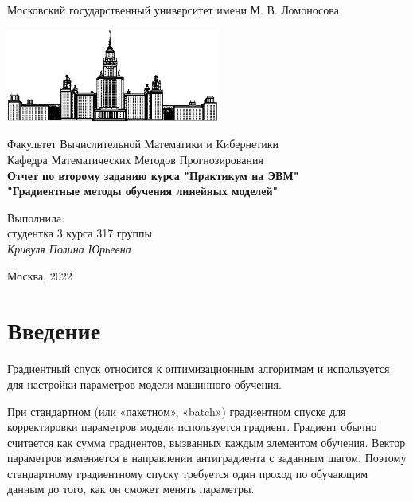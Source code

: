 \documentclass{article}
\begin{document}
\begin{titlepage}
\begin{center}
    Московский государственный университет имени М. В. Ломоносова

    \bigskip
    \includegraphics[width=70mm]{msu.eps}

    \bigskip
    Факультет Вычислительной Математики и Кибернетики\\
    Кафедра Математических Методов Прогнозирования\\[10mm]
    
    \textsf{\large\bfseries
        Отчет по второму заданию курса "Практикум на ЭВМ"\\[10mm]
        "Градиентные методы обучения линейных моделей"
    }\\[10mm]
    \begin{flushright}
        \parbox{0.5\textwidth}{
        	Выполнила:\\
        	студентка 3 курса 317 группы \\
        	\emph{Кривуля Полина Юрьевна}\\[5mm]
        }
    \end{flushright}
    \vspace{\fill}
    Москва, 2022
\end{center}
\end{titlepage}

\newpage
\tableofcontents
\newpage

\section{Введение}
Градиентный спуск относится к оптимизационным алгоритмам и используется для настройки параметров модели машинного обучения.

При стандартном (или «пакетном», «batch») градиентном спуске для корректировки параметров модели используется градиент. Градиент обычно считается как сумма градиентов, вызванных каждым элементом обучения. Вектор параметров изменяется в направлении антиградиента с заданным шагом. Поэтому стандартному градиентному спуску требуется один проход по обучающим данным до того, как он сможет менять параметры.
\end{document}
